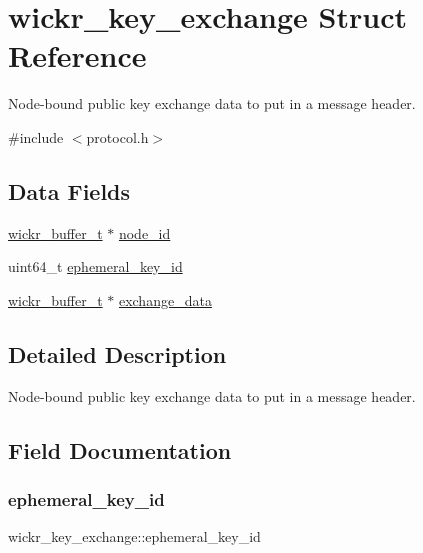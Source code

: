 \hypertarget{structwickr__key__exchange}{}\section{wickr\+\_\+key\+\_\+exchange Struct Reference}
\label{structwickr__key__exchange}


Node-\/bound public key exchange data to put in a message header.  




{\ttfamily \#include $<$protocol.\+h$>$}

\subsection*{Data Fields}
\begin{DoxyCompactItemize}
\item 
\hyperlink{structwickr__buffer}{wickr\+\_\+buffer\+\_\+t} $\ast$ \hyperlink{structwickr__key__exchange_ad5b271c9c3cf2043ec85dbb40c51fec6}{node\+\_\+id}
\item 
uint64\+\_\+t \hyperlink{structwickr__key__exchange_aa400c601e6a24cdffeb627501d36cd3e}{ephemeral\+\_\+key\+\_\+id}
\item 
\hyperlink{structwickr__buffer}{wickr\+\_\+buffer\+\_\+t} $\ast$ \hyperlink{structwickr__key__exchange_a6be89562df814a32b19cd57c49037691}{exchange\+\_\+data}
\end{DoxyCompactItemize}


\subsection{Detailed Description}
Node-\/bound public key exchange data to put in a message header. 

\subsection{Field Documentation}
\mbox{\label{structwickr__key__exchange_aa400c601e6a24cdffeb627501d36cd3e}} 
\subsubsection{\texorpdfstring{ephemeral\+\_\+key\+\_\+id}{ephemeral\_key\_id}}
{\footnotesize\ttfamily wickr\+\_\+key\+\_\+exchange\+::ephemeral\+\_\+key\+\_\+id}

